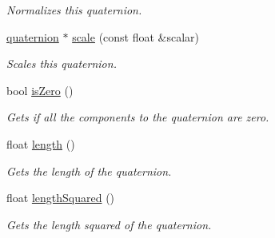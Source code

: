 \begin{DoxyCompactItemize}
\begin{DoxyCompactList}\small\item\em Normalizes this quaternion. \end{DoxyCompactList}\item 
\hyperlink{classflounder_1_1quaternion}{quaternion} $\ast$ \hyperlink{classflounder_1_1quaternion_a1dfbde3777eaa9fca021c63b40d2e2a4}{scale} (const float \&scalar)
\begin{DoxyCompactList}\small\item\em Scales this quaternion. \end{DoxyCompactList}\item 
bool \hyperlink{classflounder_1_1quaternion_a36b18505b6d34816d57ff6f29419fbc2}{is\+Zero} ()
\begin{DoxyCompactList}\small\item\em Gets if all the components to the quaternion are zero. \end{DoxyCompactList}\item 
float \hyperlink{classflounder_1_1quaternion_afcb607a0604417823b1a37ea842b5ae0}{length} ()
\begin{DoxyCompactList}\small\item\em Gets the length of the quaternion. \end{DoxyCompactList}\item 
float \hyperlink{classflounder_1_1quaternion_a3513c1cae67023bab1f4647abf6f9075}{length\+Squared} ()
\begin{DoxyCompactList}\small\item\em Gets the length squared of the quaternion. \end{DoxyCompactList}\end{DoxyCompactItemize}

